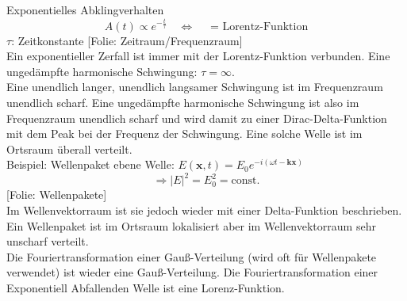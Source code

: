 \documentclass[titlepage,11pt,a4paper,ngerman]{report}
\newcommand{\tx}[1]{\textrm{#1}}
\newcommand{\const}{\tx{const.}}
\newcommand{\folie}[1]{\color{gray}[Folie: #1]\color{black}}
\renewcommand{\vec}[1]{\boldsymbol{#1}}
\newcommand{\lcom}[1]{\color{MidnightBlue}#1\color{black}}
\begin{document}


\noindent
Exponentielles Abklingverhalten
$$A(t) \propto e^{-\frac{t}{\tau}} \quad \Leftrightarrow \quad \textrm{ = Lorentz-Funktion}$$
$\tau$: Zeitkonstante
\folie{Zeitraum/Frequenzraum}\\
\lcom{Ein exponentieller Zerfall ist immer mit der Lorentz-Funktion verbunden. Eine ungedämpfte harmonische Schwingung: $\tau = \infty$. }\\
\lcom{Eine unendlich langer, unendlich langsamer Schwingung ist im Frequenzraum unendlich scharf. Eine ungedämpfte harmonische Schwingung ist also im Frequenzraum unendlich scharf und wird damit zu einer Dirac-Delta-Funktion mit dem Peak bei der Frequenz der Schwingung. Eine solche Welle ist im Ortsraum überall verteilt.}\\
Beispiel: Wellenpaket
ebene Welle: $E(\vec{x},t) = E_0 e^{-i(\omega t - \vec{k} \vec{x})}$
$$\Rightarrow |E|^2 = E_0^2 = \const$$
\folie{Wellenpakete}\\



\noindent
\lcom{Im Wellenvektorraum ist sie jedoch wieder mit einer Delta-Funktion beschrieben. Ein Wellenpaket ist im Ortsraum lokalisiert aber im Wellenvektorraum sehr unscharf verteilt.}\\
\lcom{Die Fouriertransformation einer Gauß-Verteilung (wird oft für Wellenpakete verwendet) ist wieder eine Gauß-Verteilung. Die Fouriertransformation einer Exponentiell Abfallenden Welle ist eine Lorenz-Funktion.}
\end{document}

